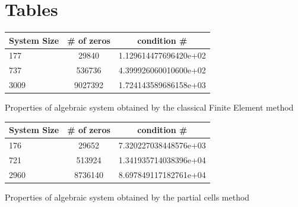 \documentclass[12pt,twoside]{article}
\makeatletter
\newenvironment{tablehere}
  {\def\@captype{table}}
  {}
\makeatother
\begin{document}
\section{Tables}
\begin{tablehere}
\begin{center}
\begin{tabular}{|l|c|c|}
\hline
System Size & \# of zeros & condition \# \\
\hline
177	 &  29840  & 1.129614477696420e+02\\
\hline
737	  & 536736 & 4.399926060010600e+02\\
\hline
3009   & 9027392  & 1.724143589686158e+03\\
\hline
\end{tabular}
\end{center}
\caption{Properties of algebraic system obtained by the classical Finite Element method}\label{tbl:systemFEM}				
\end{tablehere}
\begin{tablehere}
\begin{center}
\begin{tabular}{|l|c|c|}
\hline
System Size & \# of zeros & condition \# \\
\hline
176	 &  29652 &  7.320227038448576e+03\\
\hline
721	  & 513924 & 1.341935714038396e+04\\
\hline
2960  &  8736140 & 8.697849117182761e+04\\
\hline
\end{tabular}
\end{center}
\caption{Properties of algebraic system obtained by the partial cells method}\label{tbl:systempartial}
\end{tablehere}

\newpage
%
%
\end{document}
